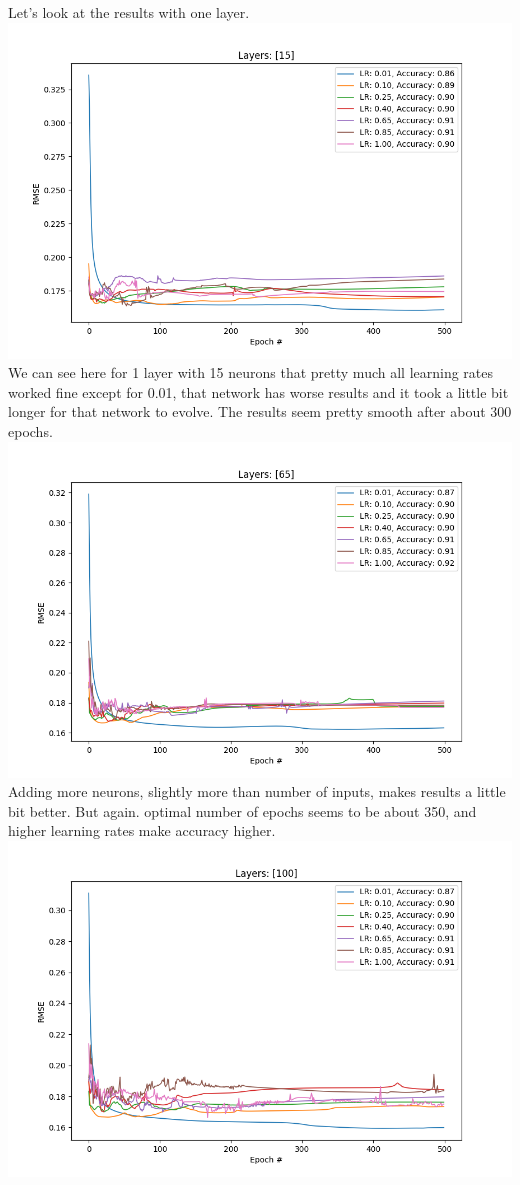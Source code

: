 \documentclass[12pt, letterpaper]{article}
\begin{document}
\begin{enumerate}[label=\Roman*.]
	Let's look at the results with one layer.
	{\center \includegraphics[scale=0.7]{../images/rmse_0.png} \\}
	We can see here for 1 layer with 15 neurons that pretty much all learning rates worked fine except for 0.01, that network has worse results and it took a little bit longer for that network to evolve. The results seem pretty smooth after about 300 epochs.
	{\center \includegraphics[scale=0.7]{../images/rmse_1.png} \\}
	Adding more neurons, slightly more than number of inputs, makes results a little bit better. But again. optimal number of epochs seems to be about 350, and higher learning rates make accuracy higher.
	{\center \includegraphics[scale=0.7]{../images/rmse_2.png} \\}

\end{enumerate}
\end{document}
